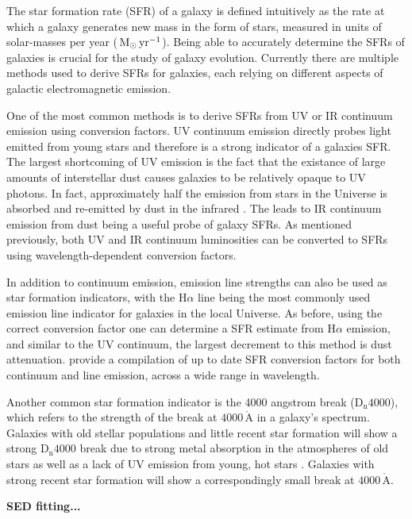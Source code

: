 The star formation rate (SFR) of a galaxy is defined intuitively as the rate
at which a galaxy generates new mass in the form of stars, measured in
units of solar-masses per year ($\,\mathrm{M_{\odot}}\,\mathrm{yr^{-1}}$).  Being
able to accurately determine the SFRs of galaxies is crucial for the
study of galaxy evolution.  Currently there are multiple methods used
to derive SFRs for galaxies, each relying on different aspects of
galactic electromagnetic emission.
\par
One of the most common methods is to derive SFRs from UV or IR
continuum 
emission using conversion factors.  UV continuum emission directly
probes light emitted from young stars and therefore is a strong
indicator of a galaxies SFR.  The largest shortcoming of UV emission
is the fact that the existance of large amounts of interstellar dust
causes galaxies to be relatively opaque to UV photons.  In fact,
approximately half the emission from stars in the Universe is absorbed
and re-emitted by dust in the infrared \citep{kennicutt2012}.
The leads to IR continuum emission from dust being a useful probe of
galaxy SFRs.  As mentioned previously, both UV and IR continuum
luminosities can be converted to SFRs using wavelength-dependent
conversion factors.
\par
In addition to continuum emission, emission line strengths can also be
used as star formation indicators, with the $\mathrm{H}\alpha$ line
being the most commonly used emission line indicator for galaxies in
the local Universe.  As before, using the correct conversion factor
one can determine a SFR estimate from $\mathrm{H}\alpha$ emission, and
similar to the UV continuum, the largest decrement to this method is
dust attenuation.  \citet{kennicutt2012} provide a compilation of up
to date SFR conversion factors for both continuum and line emission,
across a wide range in wavelength.
\par
Another common star formation indicator is the 4000 angstrom break
($\mathrm{D_n}4000$), which refers to the strength of the break at
$4000\,\mathrm{\mathring{A}}$ in a galaxy's spectrum.  Galaxies with
old stellar populations and little recent star formation will show a
strong $\mathrm{D_n}4000$ break due to strong metal absorption in the
atmospheres of old stars as well as a lack of UV emission from young,
hot stars \citep{hamilton1985}.  Galaxies with strong recent star
formation will show a correspondingly small break at
$4000\,\mathrm{\mathring{A}}$.
\par
\textbf{SED fitting...}
\par
